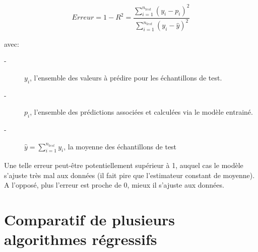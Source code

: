 \documentclass{book}
\begin{document}
\begin{equation}
Erreur = 1 - R^{2} = \frac{\sum \limits_{\underset{}{i=1}}^{n_{test}} (y_i-p_i)^2}{\sum \limits_{\underset{}{i=1}}^{n_{test}} (y_i-\widehat{y})^2}
\end{equation}

avec:
\begin{description}
\item[-] ${y_i}$, l'ensemble des valeurs à prédire pour les échantillons de test.
\item[-] ${p_i}$, l'ensemble des prédictions associées et calculées via le modèle entrainé.
\item[-] $\widehat{y} = \sum \limits_{\underset{}{i=1}}^{n_{test}} y_i$, la moyenne des échantillons de test
\end{description}
Une telle erreur peut-\^{e}tre potentiellement supérieur à 1, auquel cas le modèle s'ajuste très mal aux données (il fait pire que l'estimateur constant 
de moyenne). A l'opposé, plus l'erreur est proche de 0, mieux il s'ajuste aux données.

\section{Comparatif de plusieurs algorithmes régressifs}
\end{document}
